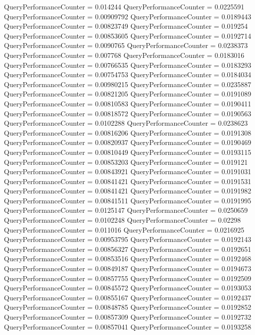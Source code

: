 \documentclass[9pt]{article}
\theoremstyle{plain}
\theoremstyle{definition}
\theoremstyle{remark}
\numberwithin{equation}{section}
\begin{document}
QueryPerformanceCounter  =  0.014244
QueryPerformanceCounter  =  0.0225591
QueryPerformanceCounter  =  0.00909792
QueryPerformanceCounter  =  0.0189443
QueryPerformanceCounter  =  0.00823749
QueryPerformanceCounter  =  0.019254
QueryPerformanceCounter  =  0.00853605
QueryPerformanceCounter  =  0.0192714
QueryPerformanceCounter  =  0.0090765
QueryPerformanceCounter  =  0.0238373
QueryPerformanceCounter  =  0.007768
QueryPerformanceCounter  =  0.0183016
QueryPerformanceCounter  =  0.00766535
QueryPerformanceCounter  =  0.0183293
QueryPerformanceCounter  =  0.00754753
QueryPerformanceCounter  =  0.0184034
QueryPerformanceCounter  =  0.00980215
QueryPerformanceCounter  =  0.0235887
QueryPerformanceCounter  =  0.00821205
QueryPerformanceCounter  =  0.0191089
QueryPerformanceCounter  =  0.00810583
QueryPerformanceCounter  =  0.0190411
QueryPerformanceCounter  =  0.00818572
QueryPerformanceCounter  =  0.0190563
QueryPerformanceCounter  =  0.0102288
QueryPerformanceCounter  =  0.0238623
QueryPerformanceCounter  =  0.00816206
QueryPerformanceCounter  =  0.0191308
QueryPerformanceCounter  =  0.00820937
QueryPerformanceCounter  =  0.0190469
QueryPerformanceCounter  =  0.00810449
QueryPerformanceCounter  =  0.0193115
QueryPerformanceCounter  =  0.00853203
QueryPerformanceCounter  =  0.019121
QueryPerformanceCounter  =  0.00843921
QueryPerformanceCounter  =  0.0191031
QueryPerformanceCounter  =  0.00841421
QueryPerformanceCounter  =  0.0191531
QueryPerformanceCounter  =  0.00841421
QueryPerformanceCounter  =  0.0191982
QueryPerformanceCounter  =  0.00841511
QueryPerformanceCounter  =  0.0191995
QueryPerformanceCounter  =  0.0125147
QueryPerformanceCounter  =  0.0250659
QueryPerformanceCounter  =  0.0102248
QueryPerformanceCounter  =  0.02298
QueryPerformanceCounter  =  0.011016
QueryPerformanceCounter  =  0.0216925
QueryPerformanceCounter  =  0.00953795
QueryPerformanceCounter  =  0.0192143
QueryPerformanceCounter  =  0.00856327
QueryPerformanceCounter  =  0.0192651
QueryPerformanceCounter  =  0.00853516
QueryPerformanceCounter  =  0.0192468
QueryPerformanceCounter  =  0.00849187
QueryPerformanceCounter  =  0.0194673
QueryPerformanceCounter  =  0.00857755
QueryPerformanceCounter  =  0.0192509
QueryPerformanceCounter  =  0.00845572
QueryPerformanceCounter  =  0.0193053
QueryPerformanceCounter  =  0.00855167
QueryPerformanceCounter  =  0.0192437
QueryPerformanceCounter  =  0.00848785
QueryPerformanceCounter  =  0.0192852
QueryPerformanceCounter  =  0.00857309
QueryPerformanceCounter  =  0.0192732
QueryPerformanceCounter  =  0.00857041
QueryPerformanceCounter  =  0.0193258
\end{document}
